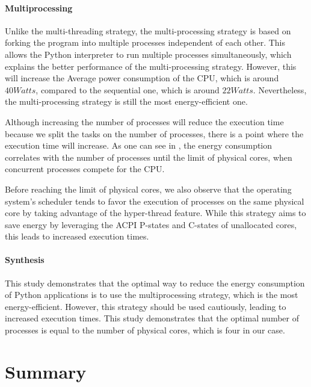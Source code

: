 \paragraph*{Multiprocessing}
Unlike the multi-threading strategy, the multi-processing strategy is based on forking the program into multiple processes independent of each other. This allows the Python interpreter to run multiple processes simultaneously, which explains the better performance of the multi-processing strategy. However, this will increase the Average power consumption of the CPU, which is around $40 Watts$, compared to the sequential one, which is around $22 Watts$. Nevertheless, the multi-processing strategy is still the most energy-efficient one.


Although increasing the number of processes will reduce the execution time because we split the tasks on the number of processes, there is a point where the execution time will increase. As one can see in , the energy consumption correlates with the number of processes until the limit of physical cores, when concurrent processes compete for the CPU.


Before reaching the limit of physical cores, we also observe that the operating system's scheduler tends to favor the execution of processes on the same physical core by taking advantage of the hyper-thread feature.
While this strategy aims to save energy by leveraging the ACPI P-states and C-states of unallocated cores, this leads to increased execution times.

\paragraph*{Synthesis}
This study demonstrates that the optimal way to reduce the energy consumption of Python applications is to use the multiprocessing strategy, which is the most energy-efficient. However, this strategy should be used cautiously, leading to increased execution times.
This study demonstrates that the optimal number of processes is equal to the number of physical cores, which is four in our case.
\clearpage

\clearpage
\section{Summary}

